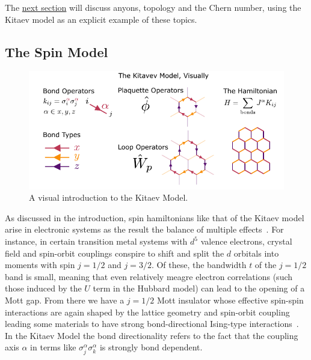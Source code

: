 The \protect\hyperlink{anyonic-statistics}{next section} will discuss anyons, topology and the Chern number, using the Kitaev model as an explicit example of these topics.

\hypertarget{the-spin-model}{%
\subsection{The Spin Model}\label{the-spin-model}}

\hypertarget{fig:visual_kitaev_1}{%
\begin{figure}
\centering
\includegraphics[width=1\textwidth,height=\textheight]{figure_code/amk_chapter/visual_kitaev_1}
\caption[{A Visual Intro to the Kitaev Model}]{A visual introduction to the Kitaev Model.}
\label{fig:visual_kitaev_1}
\end{figure}
}

As discussed in the introduction, spin hamiltonians like that of the Kitaev model arise in electronic systems as the result the balance of multiple effects~\autocite{TrebstPhysRep2022}. For instance, in certain transition metal systems with \(d^5\) valence electrons, crystal field and spin-orbit couplings conspire to shift and split the \(d\) orbitals into moments with spin \(j = 1/2\) and \(j = 3/2\). Of these, the bandwidth \(t\) of the \(j= 1/2\) band is small, meaning that even relatively meagre electron correlations (such those induced by the \(U\) term in the Hubbard model) can lead to the opening of a Mott gap. From there we have a \(j = 1/2\) Mott insulator whose effective spin-spin interactions are again shaped by the lattice geometry and spin-orbit coupling leading some materials to have strong bond-directional Ising-type interactions~\autocite{jackeliMottInsulatorsStrong2009,khaliullinOrbitalOrderFluctuations2005}. In the Kitaev Model the bond directionality refers to the fact that the coupling axis \(\alpha\) in terms like \(\sigma_j^{\alpha}\sigma_k^{\alpha}\) is strongly bond dependent.

